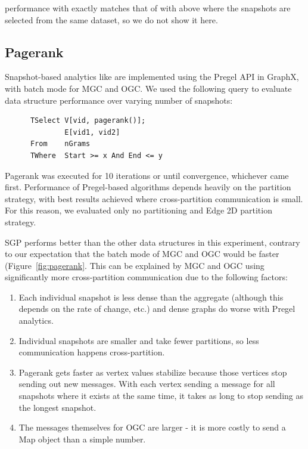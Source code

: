  performance with  exactly matches that of
 with  above where the snapshots are selected
from the same dataset, so we do not show it here.

\subsection{Pagerank}

Snapshot-based analytics like  are implemented using
the Pregel API in GraphX, with batch mode for MGC and OGC.  We used
the following query to evaluate data structure performance over
varying number of snapshots:

\begin{small}
\begin{verbatim}
      TSelect V[vid, pagerank()];
              E[vid1, vid2]
      From    nGrams
      TWhere  Start >= x And End <= y
\end{verbatim}
\end{small}

Pagerank was executed for 10 iterations or until convergence,
whichever came first.  Performance of Pregel-based algorithms depends
heavily on the partition strategy, with best results achieved where
cross-partition communication is small.  For this reason, we evaluated
only no partitioning and Edge 2D partition strategy.

SGP performs better than the other data structures in this experiment,
contrary to our expectation that the batch mode of MGC and OGC would
be faster (Figure~\ref{fig:pagerank}.  This can be explained by MGC
and OGC using significantly more cross-partition communication due to
the following factors:

\begin{enumerate}[leftmargin=*]
\item Each individual snapshot is less dense than the aggregate
  (although this depends on the rate of change, etc.) and dense graphs
  do worse with Pregel analytics.
\item Individual snapshots are smaller and take fewer partitions, so
  less communication happens cross-partition.
\item Pagerank gets faster as vertex values stabilize because those
  vertices stop sending out new messages. With each vertex sending a
  message for all snapshots where it exists at the same time, it takes
  as long to stop sending as the longest snapshot.  
\item The messages themselves for OGC are larger - it is more costly
  to send a Map object than a simple number.
\end{enumerate}

